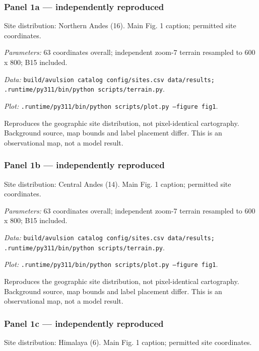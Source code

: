 \subsubsection*{Panel 1a --- independently reproduced}
Site distribution: Northern Andes (16). Main Fig. 1 caption; permitted site coordinates.

\textit{Parameters:} 63 coordinates overall; independent zoom-7 terrain resampled to 600 x 800; B15 included.

\textit{Data:} \texttt{build/\allowbreak{}avulsion catalog config/\allowbreak{}sites.csv data/\allowbreak{}results; .runtime/\allowbreak{}py311/\allowbreak{}bin/\allowbreak{}python scripts/\allowbreak{}terrain.py}.

\textit{Plot:} \texttt{.runtime/\allowbreak{}py311/\allowbreak{}bin/\allowbreak{}python scripts/\allowbreak{}plot.py --figure fig1}.

Reproduces the geographic site distribution, not pixel-identical cartography. Background source, map bounds and label placement differ. This is an observational map, not a model result.

\subsubsection*{Panel 1b --- independently reproduced}
Site distribution: Central Andes (14). Main Fig. 1 caption; permitted site coordinates.

\textit{Parameters:} 63 coordinates overall; independent zoom-7 terrain resampled to 600 x 800; B15 included.

\textit{Data:} \texttt{build/\allowbreak{}avulsion catalog config/\allowbreak{}sites.csv data/\allowbreak{}results; .runtime/\allowbreak{}py311/\allowbreak{}bin/\allowbreak{}python scripts/\allowbreak{}terrain.py}.

\textit{Plot:} \texttt{.runtime/\allowbreak{}py311/\allowbreak{}bin/\allowbreak{}python scripts/\allowbreak{}plot.py --figure fig1}.

Reproduces the geographic site distribution, not pixel-identical cartography. Background source, map bounds and label placement differ. This is an observational map, not a model result.

\subsubsection*{Panel 1c --- independently reproduced}
Site distribution: Himalaya (6). Main Fig. 1 caption; permitted site coordinates.

